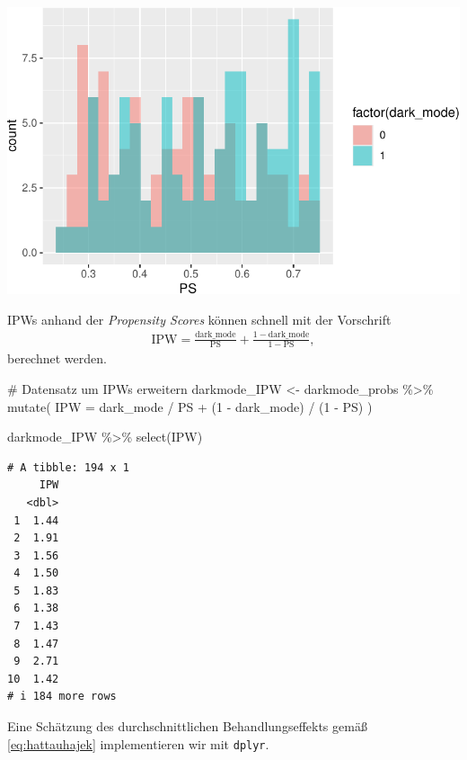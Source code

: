 \documentclass[
  a4paper,
  DIV=11,
  oneside]{scrreprt}
\newenvironment{Shaded}{\begin{snugshade}}{\end{snugshade}}
\newcommand{\AttributeTok}[1]{\textcolor[rgb]{0.40,0.45,0.13}{#1}}
\newcommand{\CommentTok}[1]{\textcolor[rgb]{0.37,0.37,0.37}{#1}}
\newcommand{\DecValTok}[1]{\textcolor[rgb]{0.68,0.00,0.00}{#1}}
\newcommand{\FunctionTok}[1]{\textcolor[rgb]{0.28,0.35,0.67}{#1}}
\newcommand{\NormalTok}[1]{\textcolor[rgb]{0.00,0.23,0.31}{#1}}
\newcommand{\OtherTok}[1]{\textcolor[rgb]{0.00,0.23,0.31}{#1}}
\newcommand{\SpecialCharTok}[1]{\textcolor[rgb]{0.37,0.37,0.37}{#1}}
\begin{document}
\includegraphics{Matching_files/figure-pdf/unnamed-chunk-23-1.pdf}

IPWs anhand der \emph{Propensity Scores} können schnell mit der
Vorschrift \begin{align}
  \text{IPW} = \frac{\text{dark\_mode}}{\text{PS}} + \frac{1 - \text{dark\_mode}}{1 - \text{PS}},
\end{align} berechnet werden.

\begin{Shaded}
\begin{Highlighting}[]
\CommentTok{\# Datensatz um IPWs erweitern}
\NormalTok{darkmode\_IPW }\OtherTok{\textless{}{-}}\NormalTok{ darkmode\_probs }\SpecialCharTok{\%\textgreater{}\%}
  \FunctionTok{mutate}\NormalTok{(}
    \AttributeTok{IPW =}\NormalTok{ dark\_mode }\SpecialCharTok{/}\NormalTok{ PS }\SpecialCharTok{+}\NormalTok{ (}\DecValTok{1} \SpecialCharTok{{-}}\NormalTok{ dark\_mode) }\SpecialCharTok{/}\NormalTok{ (}\DecValTok{1} \SpecialCharTok{{-}}\NormalTok{ PS)}
\NormalTok{  )}

\NormalTok{darkmode\_IPW }\SpecialCharTok{\%\textgreater{}\%} 
  \FunctionTok{select}\NormalTok{(IPW)}
\end{Highlighting}
\end{Shaded}

\begin{verbatim}
# A tibble: 194 x 1
     IPW
   <dbl>
 1  1.44
 2  1.91
 3  1.56
 4  1.50
 5  1.83
 6  1.38
 7  1.43
 8  1.47
 9  2.71
10  1.42
# i 184 more rows
\end{verbatim}

Eine Schätzung des durchschnittlichen Behandlungseffekts gemäß
\eqref{eq:hattauhajek} implementieren wir mit \texttt{dplyr}.
\end{document}
